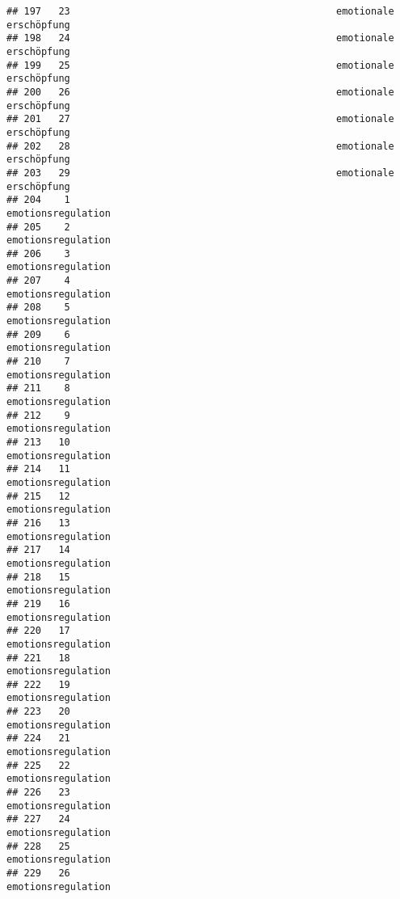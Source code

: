 \documentclass[
]{article}
\begin{document}
\begin{verbatim}
## 197   23                                              emotionale erschöpfung
## 198   24                                              emotionale erschöpfung
## 199   25                                              emotionale erschöpfung
## 200   26                                              emotionale erschöpfung
## 201   27                                              emotionale erschöpfung
## 202   28                                              emotionale erschöpfung
## 203   29                                              emotionale erschöpfung
## 204    1                                                  emotionsregulation
## 205    2                                                  emotionsregulation
## 206    3                                                  emotionsregulation
## 207    4                                                  emotionsregulation
## 208    5                                                  emotionsregulation
## 209    6                                                  emotionsregulation
## 210    7                                                  emotionsregulation
## 211    8                                                  emotionsregulation
## 212    9                                                  emotionsregulation
## 213   10                                                  emotionsregulation
## 214   11                                                  emotionsregulation
## 215   12                                                  emotionsregulation
## 216   13                                                  emotionsregulation
## 217   14                                                  emotionsregulation
## 218   15                                                  emotionsregulation
## 219   16                                                  emotionsregulation
## 220   17                                                  emotionsregulation
## 221   18                                                  emotionsregulation
## 222   19                                                  emotionsregulation
## 223   20                                                  emotionsregulation
## 224   21                                                  emotionsregulation
## 225   22                                                  emotionsregulation
## 226   23                                                  emotionsregulation
## 227   24                                                  emotionsregulation
## 228   25                                                  emotionsregulation
## 229   26                                                  emotionsregulation

\end{verbatim}
\end{document}

